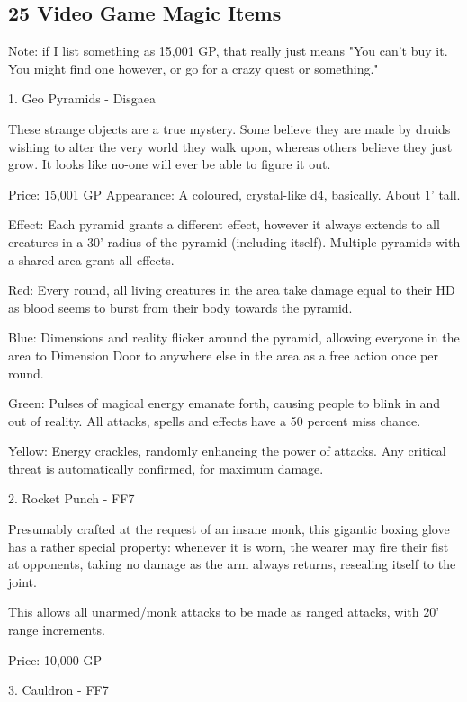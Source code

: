 \subsection{25 Video Game Magic Items} \label{comm:25videogame}

Note: if I list something as 15,001 GP, that really just means "You can't buy it. You might find one however, or go for a crazy quest or something." 

\begin{multicols}{2}

1. Geo Pyramids - Disgaea

These strange objects are a true mystery. Some believe they are made by druids wishing to alter the very world they walk upon, whereas others believe they just grow. It looks like no-one will ever be able to figure it out.

Price: 15,001 GP
Appearance: A coloured, crystal-like d4, basically. About 1' tall.

Effect: Each pyramid grants a different effect, however it always extends to all creatures in a 30' radius of the pyramid (including itself). Multiple pyramids with a shared area grant all effects.

Red: Every round, all living creatures in the area take damage equal to their HD as blood seems to burst from their body towards the pyramid.

Blue: Dimensions and reality flicker around the pyramid, allowing everyone in the area to Dimension Door to anywhere else in the area as a free action once per round.

Green: Pulses of magical energy emanate forth, causing people to blink in and out of reality. All attacks, spells and effects have a 50 percent miss chance.

Yellow: Energy crackles, randomly enhancing the power of attacks. Any critical threat is automatically confirmed, for maximum damage. 


2. Rocket Punch - FF7

Presumably crafted at the request of an insane monk, this gigantic boxing glove has a rather special property: whenever it is worn, the wearer may fire their fist at opponents, taking no damage as the arm always returns, resealing itself to the joint.

This allows all unarmed/monk attacks to be made as ranged attacks, with 20' range increments.

Price: 10,000 GP


3. Cauldron - FF7


\end{multicols}
